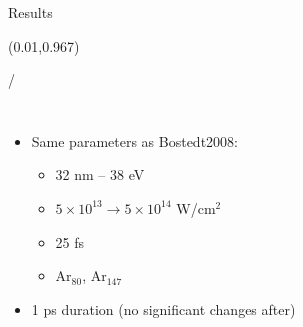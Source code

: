 \documentclass{beamer}
\makeatletter
\newcommand{\framenumber}{
\begin{textblock}{0}(0.01,0.967)
\begin{scriptsize}
{\color{gray}\insertframenumber/\inserttotalframenumber}
\end{scriptsize}
\end{textblock}
}
\makeatother
\begin{document}
\begin{frame}{Results}\framenumber


\begin{columns}
		\begin{itemize}
		\item Same parameters as Bostedt2008:
		\begin{itemize}
			\item 32 nm -- 38 eV
			\item $5\times10^{13} \rightarrow 5\times10^{14}$ W/cm$^2$
			\item 25 fs
			\item Ar$_{80}$, Ar$_{147}$
		\end{itemize}
		\item 1 ps duration (no significant changes after)
		\end{itemize}

\begin{center}



\end{center}
\end{columns}
\end{frame}
\end{document}
